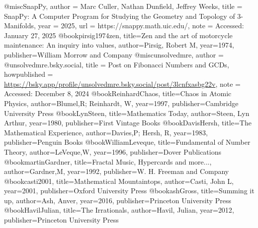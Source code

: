 @misc{SnapPy,
  author = {Marc Culler, Nathan Dunfield, Jeffrey Weeks},
  title = {SnapPy: A Computer Program for Studying the Geometry and Topology of 3-Manifolds},
  year = {2025},
  url = {https://snappy.math.uic.edu/},
  note = {Accessed: January 27, 2025}
}
@book{pirsig1974zen,
  title={Zen and the art of motorcycle maintenance: An inquiry into values},
  author={Pirsig, Robert M},
  year={1974},
  publisher={William Morrow and Company}
}
@misc{unsolvedmre,
  author       = {@unsolvedmre.bsky.social},
  title        = {Post on Fibonacci Numbers and GCDs},
  howpublished = {\url{https://bsky.app/profile/unsolvedmre.bsky.social/post/3lcnfxasbg22v}},
  note         = {Accessed: December 8, 2024}
}
@book{ReinhardChaos,
  title={Chaos in Atomic Physics},
  author={Blumel,R; Reinhardt, W},
  year={1997},
  publisher={Cambridge University Press}
}
@book{LynSteen,
  title={Mathematics Today},
  author={Steen, Lyn Arthur},
  year={1980},
  publisher={First Vintage Books}
}
@book{DavisHersh,
  title={The Mathematical Experience},
  author={Davies,P; Hersh, R},
  year={1983},
  publisher={Penguin Books}
}
@book{WilliamLeveque,
  title={Fundamental of Number Theory},
  author={LeVeque,W},
  year={1996},
  publisher={Dover Publications}
}
@book{martinGardner,
  title={Fractal Music, Hypercards and more...},
  author={Gardner,M},
  year={1992},
  publisher={W. H. Freeman and Company}
}
@book{casti2001,
  title={Mathematical Mountaintops},
  author={Casti, John L},
  year={2001},
  publisher={Oxford University Press}
}
@book{ashGross,
  title={Summing it up},
  author={Ash, Anver},
  year={2016},
  publisher={Princeton University Press}
}
@book{HavilJulian,
  title={The Irrationals},
  author={Havil, Julian},
  year={2012},
  publisher={Princeton University Press}
}

